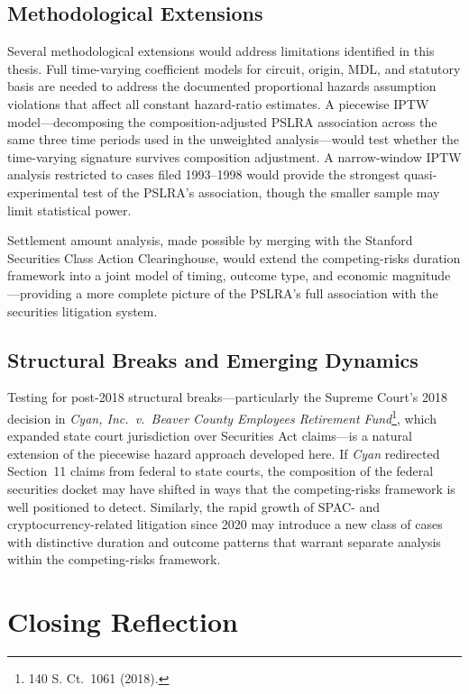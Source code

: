 \subsection{Methodological Extensions}

Several methodological extensions would address limitations
identified in this thesis. Full time-varying coefficient
models for circuit, origin, MDL, and statutory basis are
needed to address the documented proportional hazards
assumption violations that affect all constant hazard-ratio
estimates. A piecewise IPTW model---decomposing the
composition-adjusted PSLRA association across the same three
time periods used in the unweighted analysis---would test
whether the time-varying signature survives composition
adjustment. A narrow-window IPTW analysis restricted to
cases filed 1993--1998 would provide the strongest
quasi-experimental test of the PSLRA's association, though
the smaller sample may limit statistical power.

Settlement amount analysis, made possible by merging with the
Stanford Securities Class Action Clearinghouse, would extend
the competing-risks duration framework into a joint model of
timing, outcome type, and economic magnitude---providing a
more complete picture of the PSLRA's full association with
the securities litigation system.

\subsection{Structural Breaks and Emerging Dynamics}

Testing for post-2018 structural breaks---particularly the
Supreme Court's 2018 decision in \textit{Cyan, Inc.\ v.\
Beaver County Employees Retirement Fund}\footnote{140 S. Ct.\
1061 (2018).}, which expanded
state
court jurisdiction over Securities Act claims---is a natural
extension of the piecewise hazard approach developed here.
If \textit{Cyan} redirected Section~11 claims from federal
to state courts, the composition of the federal securities
docket may have shifted in ways that the competing-risks
framework is well positioned to detect. Similarly, the rapid
growth of SPAC- and cryptocurrency-related litigation since
2020 may introduce a new class of cases with distinctive
duration and outcome patterns that warrant separate
analysis within the competing-risks framework.

\section{Closing Reflection}

